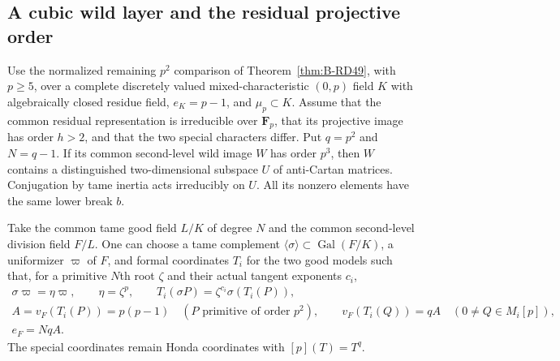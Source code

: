 \subsection{A cubic wild layer and the residual projective order}

\begin{lemma}
\label{lem:B-RD56-anti-layer}
Use the normalized remaining $p^2$ comparison of
Theorem~\ref{thm:B-RD49}, with $p\ge5$, over a complete discretely
valued mixed-characteristic $(0,p)$ field $K$ with algebraically
closed residue field, $e_K=p-1$, and $\mu_p\subset K$.
Assume that the common residual representation is irreducible over
$\mathbf F_p$, that its projective image has order $h>2$, and that
the two special characters differ. Put $q=p^2$ and $N=q-1$.
If its common second-level wild image $W$ has order $p^3$, then
$W$ contains a distinguished two-dimensional subspace $U$ of
anti-Cartan matrices. Conjugation by tame inertia acts irreducibly
on $U$. All its nonzero elements have the same lower break $b$.

Take the common tame good field $L/K$ of degree $N$ and the common
second-level division field $F/L$. One can choose a tame complement
$\langle\sigma\rangle\subset\operatorname{Gal}(F/K)$, a uniformizer
$\varpi$ of $F$, and formal coordinates $T_i$ for the two good
models such that, for a primitive $N$th root $\zeta$ and their
actual tangent exponents $c_i$,
\[
 \begin{gathered}
 \sigma\varpi=\eta\varpi,\qquad \eta=\zeta^p,\qquad
 T_i(\sigma P)=\zeta^{c_i}\sigma(T_i(P)),\\
 A=v_F(T_i(P))=p(p-1)\quad(P\text{ primitive of order }p^2),
 \qquad v_F(T_i(Q))=qA\quad(0\ne Q\in M_i[p]),\\
                         e_F=NqA.                       \tag{B-RD56.1}
 \end{gathered}
\]
The special coordinates remain Honda coordinates with $[p](T)=T^q$.
\end{lemma}
